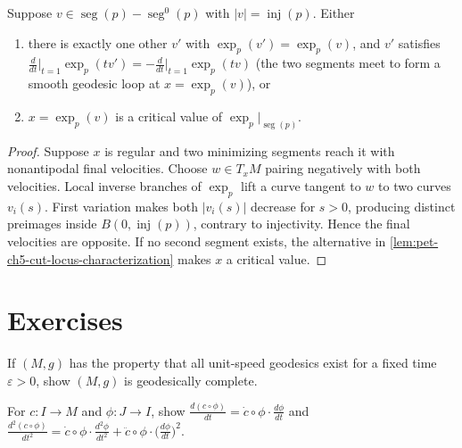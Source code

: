 \begin{lemma}
  \label{lem:pet-ch5-klingenberg}

  Suppose $v\in\operatorname{seg}(p)-\operatorname{seg}^0(p)$ with
  $|v|=\operatorname{inj}(p)$. Either
  \begin{enumerate}
  \item[(1)] there is exactly one other $v'$ with $\exp_p(v')=\exp_p(v)$, and $v'$
  satisfies $\frac{d}{dt}\big|_{t=1}\exp_p(tv')=-\frac{d}{dt}\big|_{t=1}\exp_p(tv)$
  (the two segments meet to form a smooth geodesic loop at $x=\exp_p(v)$), or
  \item[(2)] $x=\exp_p(v)$ is a critical value of $\exp_p|_{\operatorname{seg}(p)}$.
  \end{enumerate}
\end{lemma}
\begin{proof}
  \sketch
  Suppose $x$ is regular and two minimizing segments reach it with nonantipodal
  final velocities.  Choose $w\in T_xM$ pairing negatively with both velocities.
  Local inverse branches of $\exp_p$ lift a curve tangent to $w$ to two curves
  $v_i(s)$.  First variation makes both $|v_i(s)|$ decrease for $s>0$, producing
  distinct preimages inside $B(0,\operatorname{inj}(p))$, contrary to injectivity.
  Hence the final velocities are opposite.  If no second segment exists, the
  alternative in \cref{lem:pet-ch5-cut-locus-characterization} makes $x$ a critical
  value.
\end{proof}

\section{Exercises}

\begin{remark}
  \label{rem:pet-ch5-ex-1}

  If $(M,g)$ has the property that all unit-speed geodesics exist for a fixed time
  $\varepsilon>0$, show $(M,g)$ is geodesically complete.
\end{remark}

\begin{remark}
  \label{rem:pet-ch5-ex-2}

  For $c:I\to M$ and $\phi:J\to I$, show
  $\frac{d(c\circ\phi)}{dt}=\dot c\circ\phi\cdot\frac{d\phi}{dt}$ and
  $\frac{d^2(c\circ\phi)}{dt^2}=\dot c\circ\phi\cdot\frac{d^2\phi}{dt^2}
  +\ddot c\circ\phi\cdot\big(\frac{d\phi}{dt}\big)^2$.
\end{remark}

